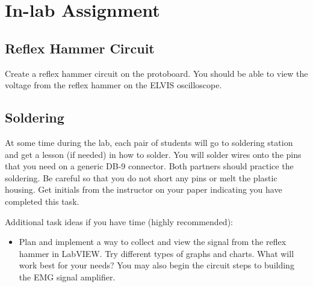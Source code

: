\documentclass{article}
\begin{document}
\section*{In-lab Assignment}
\subsection*{Reflex Hammer Circuit}		
Create a reflex hammer circuit on the protoboard. You should be able to view the voltage from the reflex hammer on the ELVIS oscilloscope.

\subsection*{Soldering}
At some time during the lab, each pair of students will go to soldering station and get a lesson (if needed) in how to solder. You will solder wires onto the pins that you need on a generic DB-9 connector. Both partners should practice the soldering. Be careful so that you do not short any pins or melt the plastic housing. Get initials from the instructor on your paper indicating you have completed this task.

\begin{info}
	Additional task ideas if you have time (highly recommended):
	\begin{itemize}
		\item Plan and implement a way to collect and view the signal from the reflex hammer in LabVIEW. Try different types of graphs and charts. What will work best for your needs? You may also begin the circuit steps to building the EMG signal amplifier.
	\end{itemize}
\end{info}
\end{document}
